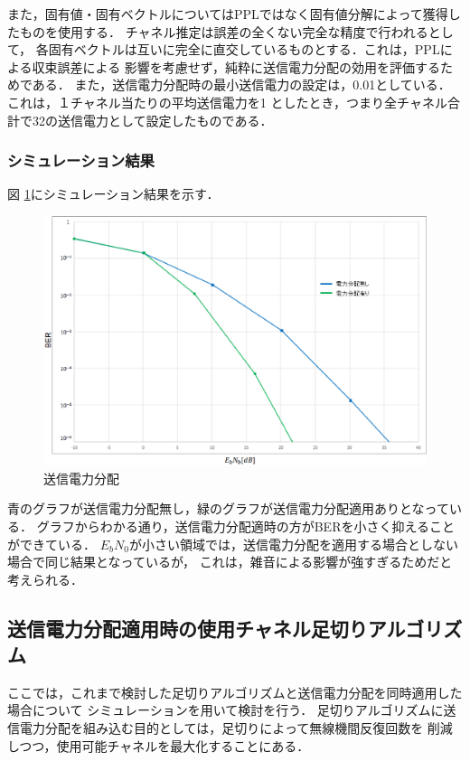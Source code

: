 また，固有値・固有ベクトルについてはPPLではなく固有値分解によって獲得したものを使用する．
チャネル推定は誤差の全くない完全な精度で行われるとして，
各固有ベクトルは互いに完全に直交しているものとする．これは，PPLによる収束誤差による
影響を考慮せず，純粋に送信電力分配の効用を評価するためである．
また，送信電力分配時の最小送信電力の設定は，0.01としている．これは，１チャネル当たりの平均送信電力を1
としたとき，つまり全チャネル合計で32の送信電力として設定したものである．

\subsubsection{シミュレーション結果}
図 \ref{figPconSim1}にシミュレーション結果を示す．

\begin{figure}[t]
    \centering
    \includegraphics[width=0.95\linewidth]{chapter4/figure/PconSim1.eps}
    \caption{送信電力分配}
    \label{figPconSim1}
\end{figure}

青のグラフが送信電力分配無し，緑のグラフが送信電力分配適用ありとなっている．
グラフからわかる通り，送信電力分配適時の方がBERを小さく抑えることができている．
$E_bN_0$が小さい領域では，送信電力分配を適用する場合としない場合で同じ結果となっているが，
これは，雑音による影響が強すぎるためだと考えられる．

\subsection{送信電力分配適用時の使用チャネル足切りアルゴリズム}
ここでは，これまで検討した足切りアルゴリズムと送信電力分配を同時適用した場合について
シミュレーションを用いて検討を行う．
足切りアルゴリズムに送信電力分配を組み込む目的としては，足切りによって無線機間反復回数を
削減しつつ，使用可能チャネルを最大化することにある．

